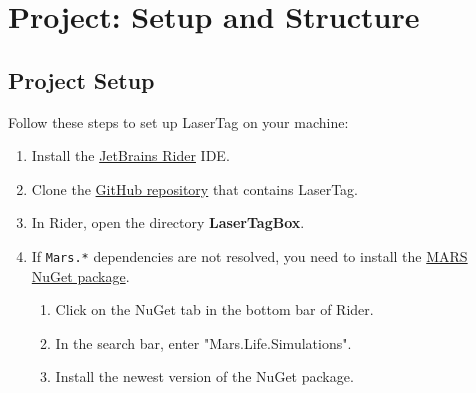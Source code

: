 \documentclass[a4paper,english,DIV=16,11pt,parskip=half,dvipsnames,listof=totoc,index=totoc,bibliography=totoc]{scrartcl}
\begin{document}
%
%
\section{Project: Setup and Structure} \label{sec:projsetupandstruc}
%
\subsection{Project Setup} \label{ssec:projsetup}
%
Follow these steps to set up LaserTag on your machine:
%
\begin{enumerate}
  \item Install the \href{https://www.jetbrains.com/rider/}{JetBrains Rider} IDE.
  \item Clone the \href{https://github.com/MARS-Group-HAW/model-mars-laser-tag-game}{GitHub repository} that contains LaserTag.
  \item In Rider, open the directory \textbf{LaserTagBox}.
  \item If \texttt{Mars.*} dependencies are not resolved, you need to install the \href{https://www.nuget.org/packages/Mars.Life.Simulations}{MARS NuGet package}.
  \begin{enumerate}
    \item Click on the NuGet tab in the bottom bar of Rider.
    \item In the search bar, enter "Mars.Life.Simulations".
    \item Install the newest version of the NuGet package.
  \end{enumerate}
\end{enumerate}
%
\end{document}
